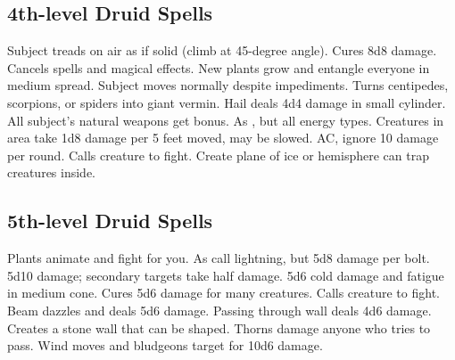\subsection{4th-level Druid Spells}
\begin{spelllist}
   Subject treads on air as if solid (climb at 45-degree angle).
   Cures 8d8 damage.
   Cancels spells and magical effects.
   New plants grow and entangle everyone in medium spread.
   Subject moves normally despite impediments.
   Turns centipedes, scorpions, or spiders into giant vermin.
   Hail deals 4d4 damage in small cylinder.
   All subject's natural weapons get  bonus.
   As , but all energy types.
   Creatures in area take 1d8 damage per 5 feet moved, may be slowed.
    AC, ignore 10 damage per round.
   Calls creature to fight.
   Create plane of ice or hemisphere can trap creatures inside.
\end{spelllist}

\subsection{5th-level Druid Spells}
\begin{spelllist}
   Plants animate and fight for you.
   As call lightning, but 5d8 damage per bolt.
   5d10 damage; secondary targets take half damage.
   5d6 cold damage and fatigue in medium cone.
   Cures 5d6 damage for many creatures.
   Calls creature to fight.
   Beam dazzles and deals 5d6 damage.
   Passing through wall deals 4d6 damage.
   Creates a stone wall that can be shaped.
   Thorns damage anyone who tries to pass.
   Wind moves and bludgeons target for 10d6 damage.
\end{spelllist}


